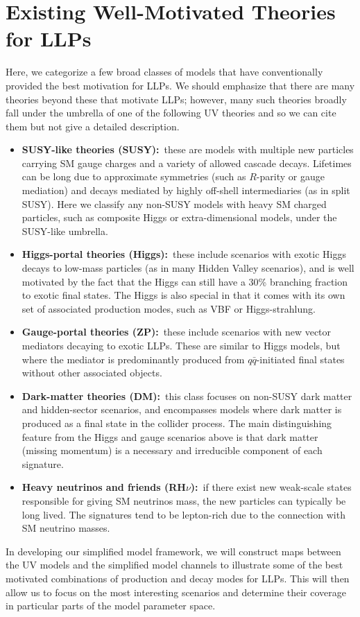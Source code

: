 \section{Existing Well-Motivated Theories for LLPs}
Here, we categorize a few broad classes of models that have conventionally provided the best motivation for LLPs. We should emphasize that there are many theories beyond these that motivate LLPs; however, many such theories broadly fall under the umbrella of one of the following UV theories and so we can cite them but not give a detailed description.
%
\begin{itemize}
\item {\bf SUSY-like theories (SUSY):}~these are models with multiple new particles carrying SM gauge charges and a variety of allowed cascade decays. Lifetimes can be long due to approximate symmetries (such as $R$-parity or gauge mediation) and decays mediated by highly off-shell intermediaries (as in split SUSY).  Here we classify any non-SUSY models with heavy SM charged particles, such as composite Higgs or extra-dimensional models, under the SUSY-like umbrella.
\item {\bf Higgs-portal theories (Higgs):}~these include scenarios with exotic Higgs decays to low-mass particles  (as in many Hidden Valley scenarios), and is well motivated by the fact that the Higgs can still have a 30\% branching fraction to exotic final states. The Higgs is also special in that it comes with its own set of associated production modes, such as VBF or Higgs-strahlung.
\item {\bf Gauge-portal theories (ZP):}~these include scenarios with new vector mediators decaying to exotic LLPs. These are similar to Higgs models, but where the mediator is predominantly produced from $q\bar{q}$-initiated final states without other associated objects.
\item {\bf Dark-matter theories (DM):}~this class focuses on non-SUSY dark matter and hidden-sector scenarios, and encompasses models where dark matter is produced as a final state in the collider process. The main distinguishing feature from the Higgs and gauge scenarios above is that dark matter (missing momentum) is a necessary and irreducible component of each signature.
\item {\bf Heavy neutrinos and friends (RH$\nu$):}~if there exist new weak-scale states responsible for giving SM neutrinos mass, the new particles can typically be long lived. The signatures tend to be lepton-rich due to the connection with SM neutrino masses.
\end{itemize}
%
In developing our simplified model framework, we will construct maps between the UV models and the simplified model channels to illustrate some of the best motivated combinations of production and decay modes for LLPs. This will then allow us to focus on the most interesting scenarios and determine their coverage in particular parts of the model parameter space.

